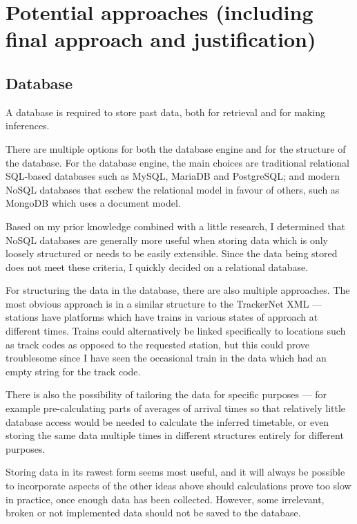 \documentclass[a4paper,12pt]{article}
\begin{document}
\section{Potential approaches (including final approach and justification)}

\subsection{Database}

A database is required to store past data, both for retrieval and for making
inferences.

There are multiple options for both the database engine and for the structure
of the database. For the database engine, the main choices are traditional
relational SQL-based databases such as MySQL, MariaDB and PostgreSQL; and
modern NoSQL databases that eschew the relational model in favour of others,
such as MongoDB which uses a document model.

Based on my prior knowledge combined with a little research, I determined that
NoSQL databases are generally more useful when storing data which is only
loosely structured or needs to be easily extensible. Since the data being
stored does not meet these criteria, I quickly decided on a relational
database.

For structuring the data in the database, there are also multiple approaches.
The most obvious approach is in a similar structure to the TrackerNet XML ---
stations have platforms which have trains in various states of approach at
different times. Trains could alternatively be linked specifically to locations
such as track codes as opposed to the requested station, but this could prove
troublesome since I have seen the occasional train in the data which had an
empty string for the track code.

There is also the possibility of tailoring the data for specific purposes ---
for example pre-calculating parts of averages of arrival times so that
relatively little database access would be needed to calculate the inferred
timetable, or even storing the same data multiple times in different structures
entirely for different purposes.

Storing data in its rawest form seems most useful, and it will
always be possible to incorporate aspects of the other ideas above should
calculations prove too slow in practice, once enough data has been collected.
However, some irrelevant, broken or not implemented data should not be saved to
the database.
\end{document}
